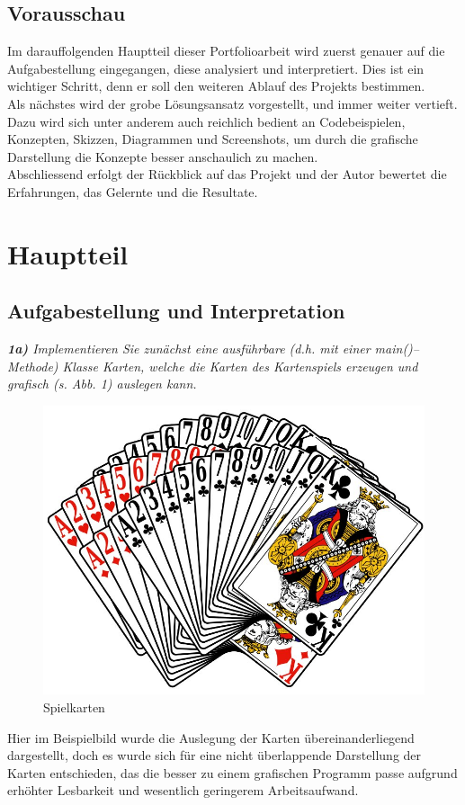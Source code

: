 \documentclass[a4paper,11pt]{article}
\begin{document}
\subsection{Vorausschau}

Im darauffolgenden Hauptteil dieser Portfolioarbeit wird zuerst genauer auf die Aufgabestellung eingegangen, diese analysiert und interpretiert. Dies ist ein wichtiger Schritt, denn er soll den weiteren Ablauf des Projekts bestimmen.\\

Als nächstes wird der grobe Lösungsansatz vorgestellt, und immer weiter vertieft. Dazu wird sich unter anderem auch reichlich bedient an Codebeispielen, Konzepten, Skizzen, Diagrammen und Screenshots, um durch die grafische Darstellung die Konzepte besser anschaulich zu machen.\\

Abschliessend erfolgt der Rückblick auf das Projekt und der Autor bewertet die Erfahrungen, das Gelernte und die Resultate.


\section{Hauptteil}

\subsection{Aufgabestellung und Interpretation}

\textit{\textbf{1a)} Implementieren Sie zunächst eine ausführbare (d.h. mit einer main()–Methode) Klasse Karten, welche die Karten des Kartenspiels erzeugen und grafisch (s. Abb. 1) auslegen kann.}

\begin{figure}[H]
    \centering
    \includegraphics[width=.45\textwidth]{media/spielkarten.jpg}
    \caption{Spielkarten}
\end{figure}

Hier im Beispielbild wurde die Auslegung der Karten übereinanderliegend dargestellt, doch es wurde sich für eine nicht überlappende Darstellung der Karten entschieden, das die besser zu einem grafischen Programm passe aufgrund erhöhter Lesbarkeit und wesentlich geringerem Arbeitsaufwand.\\
\end{document}
